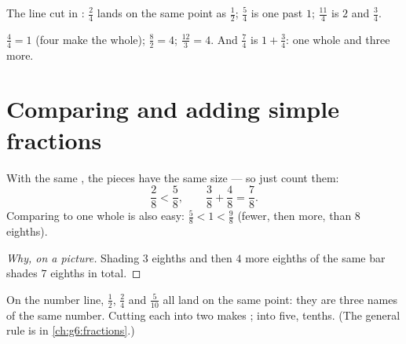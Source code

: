 \begin{omfigure}

{\small The line cut in : $\frac24$ lands on the same point
as $\frac12$; $\frac54$ is one  past $1$; $\frac{11}{4}$ is
$2$ and $\frac34$.}
\end{omfigure}

\begin{example}\label{ex:g4:fractions:whole}
$\frac44 = 1$ (four  make the whole); $\frac82 = 4$;
$\frac{12}{3} = 4$. And $\frac74$ is $1 + \frac34$: one whole and
three  more.
\end{example}

\section{Comparing and adding simple fractions}

\begin{proposition}\label{prop:g4:fractions:compare}
With the same , the pieces have the same size --- so just
count them:
\[
\frac{2}{8} < \frac{5}{8},
\qquad
\frac{3}{8} + \frac{4}{8} = \frac{7}{8}.
\]
Comparing to one whole is also easy: $\frac{5}{8} < 1 < \frac{9}{8}$
(fewer, then more, than $8$ eighths).
\end{proposition}

\begin{proof}[Why, on a picture]
Shading $3$ eighths and then $4$ more eighths of the same bar shades
$7$ eighths in total.
\end{proof}

\begin{example}\label{ex:g4:fractions:equal}
On the number line, $\frac12$, $\frac24$ and $\frac{5}{10}$ all land
on the same point: they are three names of the same number. Cutting
each  into two makes ; into five, tenths. (The general
rule is in \cref{ch:g6:fractions}.)
\end{example}

